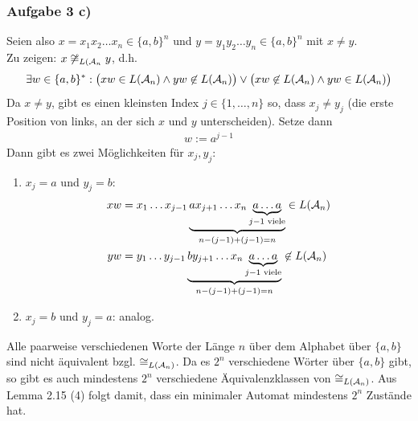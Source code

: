\subsubsection{Aufgabe 3 c)}
Seien also $x=x_1 x_2\hdots x_n\in\lbrace a,b\rbrace^n$ und $y=y_1 y_2\hdots y_n\in\lbrace a,b\rbrace^n$ mit $x\neq y$.\\
Zu zeigen: $x\not\cong_{L(\mathcal{A}_n} y$, d.h.
\begin{align*}
	\exists w\in\lbrace a,b\rbrace^\ast:\big(xw\in L(\mathcal{A}_n)\wedge yw\not\in L(\mathcal{A}_n)\big)\vee\big(xw\not\in L(\mathcal{A}_n)\wedge yw\in L(\mathcal{A}_n)\big)
\end{align*}
Da $x\neq y$, gibt es einen kleinsten Index $j\in\lbrace1,\ldots,n\rbrace$ so, dass $x_j\neq y_j$ (die erste Position von links, an der sich $x$ und $y$ unterscheiden). 
Setze dann 
\begin{align*}
	w:=a^{j-1}
\end{align*}
Dann gibt es zwei Möglichkeiten für $x_j,y_j$:
\begin{enumerate}
	\item $x_j=a$ und $y_j=b$:
	\begin{align*}
		xw&=x_1\hdots x_{j-1}\underbrace{ a x_{j+1}\hdots x_n\underbrace{a\hdots a}_{j-1\text{ viele}}}_{n-(j-1)+(j-1)=n}\in L(\mathcal{A}_n)\\
		yw&=y_1\hdots y_{j-1}\underbrace{ b y_{j+1}\hdots x_n\underbrace{a\hdots a}_{j-1\text{ viele}}}_{n-(j-1)+(j-1)=n}\not\in L(\mathcal{A}_n)
	\end{align*}
	\item $x_j=b$ und $y_j=a$: analog.
\end{enumerate}

Alle paarweise verschiedenen Worte der Länge $n$ über dem Alphabet über $\lbrace a,b\rbrace$ sind nicht äquivalent bzgl. $\cong_{L(\mathcal{A}_n)}$. Da es $2^n$ verschiedene Wörter über $\lbrace a,b\rbrace$ gibt, so gibt es auch mindestens $2^n$ verschiedene Äquivalenzklassen von $\cong_{L(\mathcal{A}_n)}$. Aus Lemma 2.15 (4) folgt damit, dass ein minimaler Automat mindestens $2^n$ Zustände hat.
